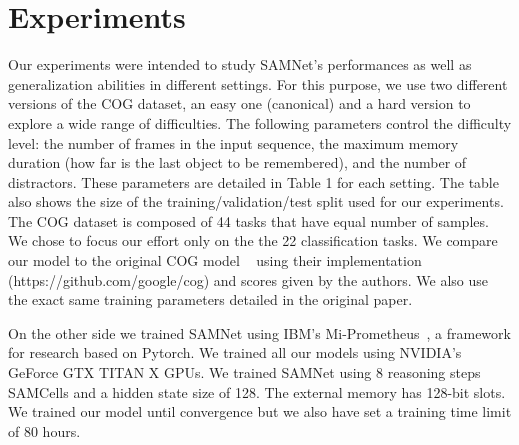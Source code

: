\section{Experiments}


Our experiments were intended to study SAMNet's performances as well as generalization abilities in different settings. For this purpose, we use two different versions of the COG dataset, an easy one (canonical) and a hard version to explore a wide range of difficulties. The following parameters control the difficulty level: the number of frames in the input sequence, the maximum memory duration (how far is the last object to be remembered), and the number of distractors. These parameters are detailed in Table 1 for each setting. The table also shows the size of the training/validation/test split used for our experiments. The COG dataset is composed of 44 tasks that have equal number of samples.
We chose to focus our effort only on the the 22 classification tasks.
We compare our model to the original COG model  ~\cite{yang2018dataset} using their implementation (https://github.com/google/cog) and scores given by the authors. We also use the exact same training parameters detailed in the original paper.

On the other side we trained SAMNet using IBM's Mi-Prometheus~\cite{kornuta2018accelerating}, a framework for research based on Pytorch. We trained all our models using NVIDIA’s GeForce GTX TITAN X GPUs. We trained  SAMNet using 8 reasoning steps SAMCells and a hidden state size of 128. The external memory has 128-bit slots. We trained our model until convergence but we also have set a training time limit of 80 hours.



